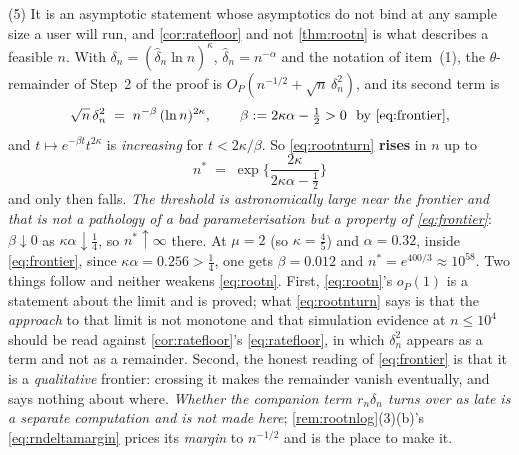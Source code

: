 \begin{remark}
(5) It is an asymptotic statement whose asymptotics do not bind at any sample size a user will run,
and \cref{cor:ratefloor} and not \cref{thm:rootn} is what describes a feasible $n$. With
$\delta_n=(\hat\delta_n\ln n)^{\kappa}$, $\hat\delta_n=n^{-\alpha}$ and the notation of item~(1), the
$\theta$-remainder of Step~2 of the proof is $O_P(n^{-1/2}+\sqrt n\,\delta_n^{2})$, and its second term is
\begin{equation}\label{eq:rootnturn}
\sqrt n\,\delta_n^{2}\;=\;n^{-\beta}\,(\ln n)^{2\kappa},
\qquad \beta:=2\kappa\alpha-\tfrac12>0\ \ \text{by \eqref{eq:frontier}} ,
\end{equation}
and $t\mapsto e^{-\beta t}t^{2\kappa}$ is \emph{increasing} for $t<2\kappa/\beta$. So \eqref{eq:rootnturn}
\textbf{rises} in $n$ up to
\[
n^{\ast}\;=\;\exp\Big\{\frac{2\kappa}{2\kappa\alpha-\tfrac12}\Big\}
\]
and only then falls. \emph{The threshold is astronomically large near the frontier and that is not a
pathology of a bad parameterisation but a property of \eqref{eq:frontier}}: $\beta\downarrow0$ as
$\kappa\alpha\downarrow\tfrac14$, so $n^{\ast}\uparrow\infty$ there. At $\mu=2$ (so $\kappa=\tfrac45$) and
$\alpha=0.32$, inside \eqref{eq:frontier}, since $\kappa\alpha=0.256>\tfrac14$, one gets
$\beta=0.012$ and $n^{\ast}=e^{400/3}\approx10^{58}$. Two things follow and neither weakens
\eqref{eq:rootn}. First, \eqref{eq:rootn}'s $o_P(1)$ is a statement about the limit and is proved;
what \eqref{eq:rootnturn} says is that the \emph{approach} to that limit is not monotone and that
simulation evidence at $n\le10^{4}$ should be read against \cref{cor:ratefloor}'s
\eqref{eq:ratefloor}, in which $\delta_n^{2}$ appears as a term and not as a remainder. Second, the
honest reading of \eqref{eq:frontier} is that it is a \emph{qualitative} frontier: crossing it makes the
remainder vanish eventually, and says nothing about where. \emph{Whether the companion term $r_n\delta_n$
turns over as late is a separate computation and is not made here}; \cref{rem:rootnlog}\textup{(3)}(b)'s
\eqref{eq:rndeltamargin} prices its \emph{margin} to $n^{-1/2}$ and is the place to make it.


\end{remark}
